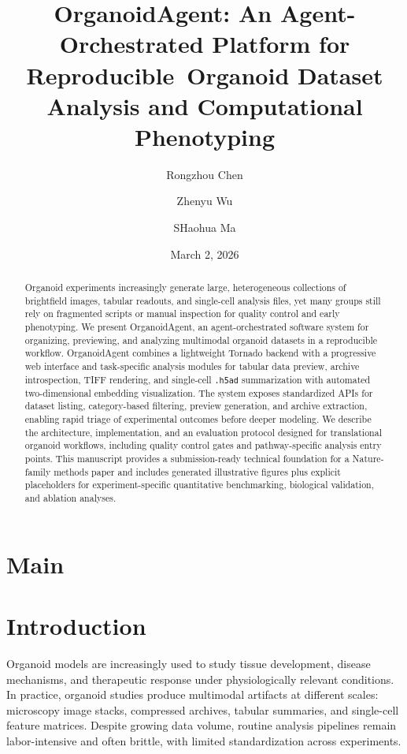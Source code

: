 \documentclass[11pt]{article}
\title{OrganoidAgent: An Agent-Orchestrated Platform for Reproducible\
Organoid Dataset Analysis and Computational Phenotyping}
\author{
Rongzhou Chen \and Zhenyu Wu \and SHaohua Ma
}
\date{March 2, 2026}
\begin{document}
\maketitle
\linenumbers
\doublespacing

\begin{abstract}
Organoid experiments increasingly generate large, heterogeneous collections of brightfield images, tabular readouts, and single-cell analysis files, yet many groups still rely on fragmented scripts or manual inspection for quality control and early phenotyping. We present OrganoidAgent, an agent-orchestrated software system for organizing, previewing, and analyzing multimodal organoid datasets in a reproducible workflow. OrganoidAgent combines a lightweight Tornado backend with a progressive web interface and task-specific analysis modules for tabular data preview, archive introspection, TIFF rendering, and single-cell \texttt{.h5ad} summarization with automated two-dimensional embedding visualization. The system exposes standardized APIs for dataset listing, category-based filtering, preview generation, and archive extraction, enabling rapid triage of experimental outcomes before deeper modeling. We describe the architecture, implementation, and an evaluation protocol designed for translational organoid workflows, including quality control gates and pathway-specific analysis entry points. This manuscript provides a submission-ready technical foundation for a Nature-family methods paper and includes generated illustrative figures plus explicit placeholders for experiment-specific quantitative benchmarking, biological validation, and ablation analyses.
\end{abstract}

\section*{Main}

\section{Introduction}
Organoid models are increasingly used to study tissue development, disease mechanisms, and therapeutic response under physiologically relevant conditions. In practice, organoid studies produce multimodal artifacts at different scales: microscopy image stacks, compressed archives, tabular summaries, and single-cell feature matrices. Despite growing data volume, routine analysis pipelines remain labor-intensive and often brittle, with limited standardization across experiments.
\end{document}
